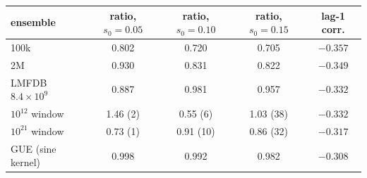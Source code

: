 \begin{tabular}{@{}lcccc@{}}
\toprule
ensemble & ratio, $s_{0}=0.05$ & ratio, $s_{0}=0.10$ & ratio, $s_{0}=0.15$ & lag-1 corr.\\
\midrule
100k & 0.802 & 0.720 & 0.705 & $-0.357$\\
2M & 0.930 & 0.831 & 0.822 & $-0.349$\\
LMFDB $8.4\times10^{9}$ & 0.887 & 0.981 & 0.957 & $-0.332$\\
$10^{12}$ window & 1.46 (2) & 0.55 (6) & 1.03 (38) & $-0.332$\\
$10^{21}$ window & 0.73 (1) & 0.91 (10) & 0.86 (32) & $-0.317$\\
GUE (sine kernel) & 0.998 & 0.992 & 0.982 & $-0.308$\\
\bottomrule
\end{tabular}
